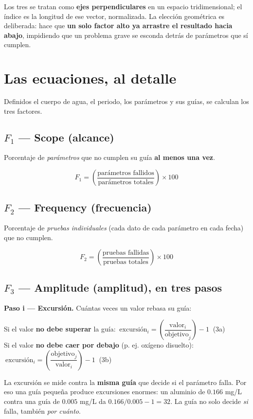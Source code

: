 \documentclass[11pt,a4paper]{article}
\newcommand{\eqbox}[1]{\begin{tcolorbox}[enhanced,colback=white,colframe=line,boxrule=0.8pt,arc=6pt,
  left=8pt,right=8pt,top=4pt,bottom=4pt]#1\end{tcolorbox}}
\begin{document}
Los tres se tratan como \textbf{ejes perpendiculares} en un espacio tridimensional; el índice es la
longitud de ese vector, normalizada. La elección geométrica es deliberada: hace que \textbf{un solo
factor alto ya arrastre el resultado hacia abajo}, impidiendo que un problema grave se esconda
detrás de parámetros que sí cumplen.

\section{Las ecuaciones, al detalle}
Definidos el cuerpo de agua, el periodo, los parámetros y sus guías, se calculan los tres factores.

\subsection{$F_1$ — Scope (alcance)}
Porcentaje de \emph{parámetros} que no cumplen su guía \textbf{al menos una vez}.
\eqbox{\[F_1=\left(\frac{\text{parámetros fallidos}}{\text{parámetros totales}}\right)\times 100\tag{1}\]}

\subsection{$F_2$ — Frequency (frecuencia)}
Porcentaje de \emph{pruebas individuales} (cada dato de cada parámetro en cada fecha) que no cumplen.
\eqbox{\[F_2=\left(\frac{\text{pruebas fallidas}}{\text{pruebas totales}}\right)\times 100\tag{2}\]}

\subsection{$F_3$ — Amplitude (amplitud), en tres pasos}
\textbf{Paso i — Excursión.} Cuántas veces un valor rebasa su guía:
\eqbox{
Si el valor \textbf{no debe superar} la guía: \(\ \text{excursión}_i=\left(\dfrac{\text{valor}_i}{\text{objetivo}_j}\right)-1\ \) (3a)\\[3pt]
Si el valor \textbf{no debe caer por debajo} (p. ej. oxígeno disuelto): \(\ \text{excursión}_i=\left(\dfrac{\text{objetivo}_j}{\text{valor}_i}\right)-1\ \) (3b)}

\begin{keybox}
La excursión se mide contra la \textbf{misma guía} que decide si el parámetro falla. Por eso una guía
pequeña produce excursiones enormes: un aluminio de $0.166$ mg/L contra una guía de $0.005$ mg/L da
$0.166/0.005-1=32$. La guía no solo decide \emph{si} falla, también \emph{por cuánto}.
\end{keybox}
\end{document}
